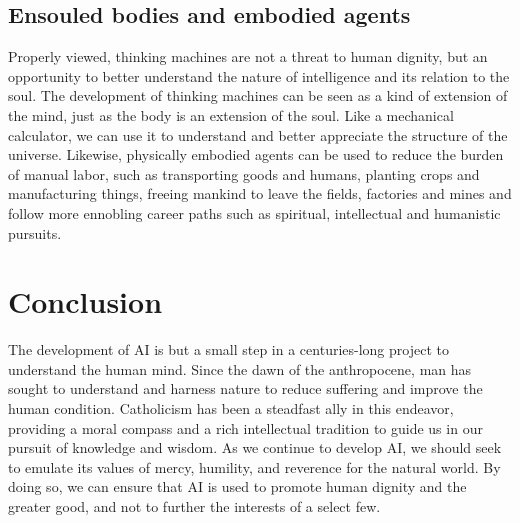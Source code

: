 \documentclass[sigplan,nonacm]{acmart}\settopmatter{printfolios=false,printccs=false,printacmref=false}
\begin{document}
  \subsection{Ensouled bodies and embodied agents}

  Properly viewed, thinking machines are not a threat to human dignity, but an opportunity to better understand the nature of intelligence and its relation to the soul. The development of thinking machines can be seen as a kind of extension of the mind, just as the body is an extension of the soul. Like a mechanical calculator, we can use it to understand and better appreciate the structure of the universe. Likewise, physically embodied agents can be used to reduce the burden of manual labor, such as transporting goods and humans, planting crops and manufacturing things, freeing mankind to leave the fields, factories and mines and follow more ennobling career paths such as spiritual, intellectual and humanistic pursuits.

  \clearpage
  \section{Conclusion}

  The development of AI is but a small step in a centuries-long project to understand the human mind. Since the dawn of the anthropocene, man has sought to understand and harness nature to reduce suffering and improve the human condition. Catholicism has been a steadfast ally in this endeavor, providing a moral compass and a rich intellectual tradition to guide us in our pursuit of knowledge and wisdom. As we continue to develop AI, we should seek to emulate its values of mercy, humility, and reverence for the natural world. By doing so, we can ensure that AI is used to promote human dignity and the greater good, and not to further the interests of a select few.

  
\clearpage
\end{document}
